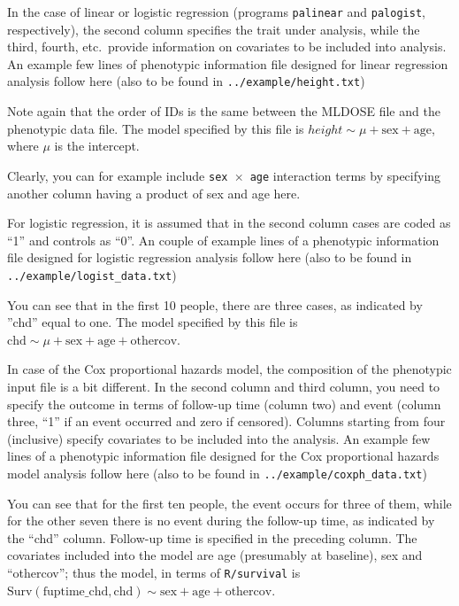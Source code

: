 \documentclass[12pt,a4paper]{article}
\begin{document}
In the case of linear or logistic regression (programs \texttt{palinear} and
\texttt{palogist}, respectively), the second column specifies the trait
under analysis, while the third, fourth, etc.~provide information on
covariates to be included into analysis.
An example few lines of phenotypic information file designed for
linear regression analysis follow here (also
to be found in \texttt{../example/height.txt})



Note again that the order of IDs is the same between the MLDOSE file
and the phenotypic data file. The model specified by this file is
$height \sim \mu + \textrm{sex} + \textrm{age}$, where $\mu$ is the intercept.

Clearly, you can for example include \texttt{sex $\times$ age} interaction terms by
specifying another column having a product of sex and age here.

For logistic regression, it is assumed that in the second column cases are
coded as ``1'' and controls as ``0''. An couple of example lines of a phenotypic
information file designed for logistic regression analysis follow here (also
to be found in \texttt{../example/logist\_data.txt})



You can see that in the first 10 people, there are three cases, as indicated
by ''chd'' equal to one. The model specified by this file
is $\textrm{chd} \sim \mu + \textrm{sex} + \textrm{age} + \textrm{othercov}$.

In case of the Cox proportional hazards model, the composition of the
phenotypic input file is a bit different. In the second column and
third column, you need to specify the outcome in terms of follow-up
time (column two) and event (column three, ``1'' if an event occurred
and zero if censored). Columns starting from four (inclusive) specify
covariates to be included into the analysis. An example few lines of
a phenotypic information file designed for the Cox proportional hazards model
analysis follow here (also to be found in
\texttt{../example/coxph\_data.txt})



You can see that for the first ten people, the event occurs for three of
them, while for the other seven there is no event during the follow-up
time, as indicated by the ``chd'' column. Follow-up time is specified in the preceding
column. The covariates included into the model are age (presumably
at baseline), sex and ``othercov''; thus the model, in terms of
\texttt{R/survival} is \\ $\textrm{Surv}(\textrm{fuptime\_chd},
\textrm{chd}) \sim \textrm{sex} + \textrm{age} + \textrm{othercov}$.
\end{document}
